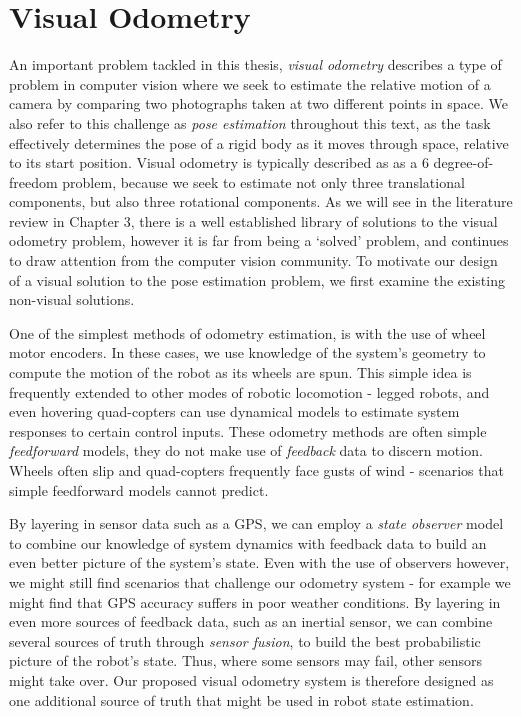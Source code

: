 \section{Visual Odometry}

An important problem tackled in this thesis, \textit{visual odometry} describes a type of problem in computer vision where we seek to estimate the relative motion of a camera by comparing two photographs taken at two different points in space. We also refer to this challenge as \textit{pose estimation} throughout this text, as the task effectively determines the pose of a rigid body as it moves through space, relative to its start position. Visual odometry is typically described as as a 6 degree-of-freedom problem, because we seek to estimate not only three translational components, but also three rotational components. As we will see in the literature review in Chapter 3, there is a well established library of solutions to the visual odometry problem, however it is far from being a `solved' problem, and continues to draw attention from the computer vision community. To motivate our design of a visual solution to the pose estimation problem, we first examine the existing non-visual solutions.

One of the simplest methods of odometry estimation, is with the use of wheel motor encoders. In these cases, we use knowledge of the system's geometry to compute the motion of the robot as its wheels are spun. This simple idea is frequently extended to other modes of robotic locomotion - legged robots, and even hovering quad-copters can use dynamical models to estimate system responses to certain control inputs. These odometry methods are often simple \textit{feedforward} models, they do not make use of \textit{feedback} data to discern motion. Wheels often slip and quad-copters frequently face gusts of wind - scenarios that simple feedforward models cannot predict. 

By layering in sensor data such as a GPS, we can employ a \textit{state observer} model to combine our knowledge of system dynamics with feedback data to build an even better picture of the system's state. Even with the use of observers however, we might still find scenarios that challenge our odometry system - for example we might find that GPS accuracy suffers in poor weather conditions. By layering in even more sources of feedback data, such as an inertial sensor, we can combine several sources of truth through \textit{sensor fusion}, to build the best probabilistic picture of the robot's state. Thus, where some sensors may fail, other sensors might take over. Our proposed visual odometry system is therefore designed as one additional source of truth that might be used in robot state estimation. 

